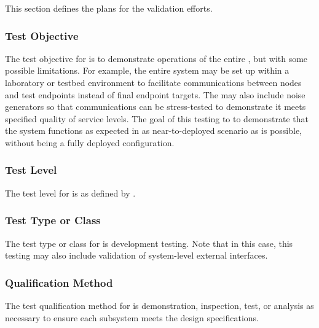 


This section defines the plans for the \TestIdNameX validation efforts.

\subsubsection{Test Objective}
\label{loc:TestObjective\TestIdName}

The test objective for \TestIdNameX is to demonstrate operations of the entire \ThisSys, but with some possible limitations.
For example, the entire system may be set up within a laboratory or testbed environment to facilitate \RF communications between nodes and test endpoints instead of final endpoint targets.
The \TestIdNameX may also include noise generators so that communications can be stress-tested to demonstrate it meets specified quality of service levels.
The goal of this testing to to demonstrate that the system functions as expected in as near-to-deployed scenario as is possible, without being a fully deployed configuration.

\subsubsection{Test Level}
\label{loc:TestLevels\TestIdName}

The test level for \TestIdNameX is \StageFive as defined by \citeStageTestingSTD.

\subsubsection{Test Type or Class}
\label{loc:TestType\TestIdName}

The test type or class for \TestIdNameX is development testing.
Note that in this case, this testing may also include validation of system-level external interfaces.

\subsubsection{Qualification Method}
\label{loc:TestQualificationMethod\TestIdName}

The test qualification method for \TestIdNameX is demonstration, inspection, test, or analysis as necessary to ensure each subsystem meets the design specifications.

